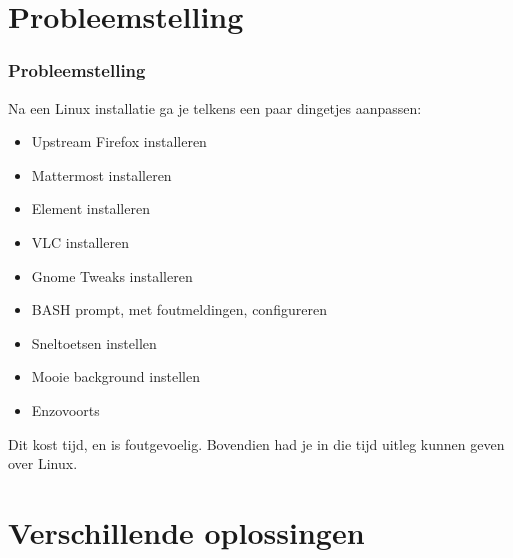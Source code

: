 \documentclass{beamer}
\begin{document}
\section{Probleemstelling}


\begin{frame}
\frametitle{Probleemstelling}
Na een Linux installatie ga je telkens een paar dingetjes aanpassen:
\begin{itemize}
  \item Upstream Firefox installeren
  \item Mattermost installeren
  \item Element installeren
  \item VLC installeren
  \item Gnome Tweaks installeren
  \item BASH prompt, met foutmeldingen, configureren
  \item Sneltoetsen instellen
  \item Mooie background instellen
  \item Enzovoorts
\end{itemize}
Dit kost tijd, en is foutgevoelig. Bovendien had je in die tijd uitleg kunnen geven over Linux.
\end{frame}

\section{Verschillende oplossingen}
\end{document}
